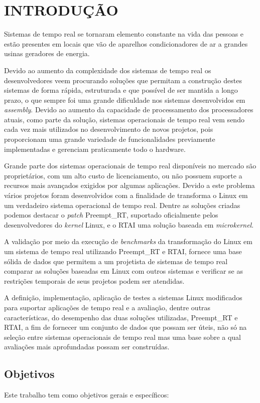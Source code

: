 \chapter{INTRODUÇÃO}
\label{cap:introducao}
Sistemas de tempo real se tornaram elemento constante na vida das pessoas e estão presentes em locais que vão de aparelhos condicionadores de ar a grandes usinas geradores de energia.

Devido ao aumento da complexidade dos sistemas de tempo real os desenvolvedores veem procurando soluções que permitam a construção destes sistemas de forma rápida, estruturada e que possível de ser mantida a longo prazo, o que sempre foi uma grande dificuldade nos sistemas desenvolvidos  em \textit{assembly}. Devido ao aumento da capacidade de processamento dos processadores atuais, como parte da solução, sistemas operacionais de tempo real vem sendo cada vez mais utilizados no desenvolvimento de novos projetos, pois proporcionam uma grande variedade de funcionalidades previamente implementadas e gerenciam praticamente todo o hardware. 

Grande parte dos sistemas operacionais de tempo real disponíveis no mercado são proprietários, com um alto custo de licenciamento, ou não possuem suporte a recursos mais avançados exigidos por algumas aplicações. Devido a este problema vários projetos foram desenvolvidos com a finalidade de transforma o Linux em um verdadeiro sistema operacional de tempo real. Dentre as soluções criadas podemos destacar o \textit{patch} Preempt\_RT, suportado oficialmente pelos desenvolvedores do \textit{kernel} Linux, e o RTAI uma solução baseada em \textit{microkernel}.

A validação por meio da execução de \textit{benchmarks} da transformação do Linux em um sistema de tempo real utilizando Preempt\_RT e RTAI, fornece uma base sólida de dados que permitem a um projetista de sistemas de tempo real comparar as soluções baseadas em Linux com outros sistemas e verificar se as restrições temporais de seus projetos podem ser atendidas.

A definição, implementação, aplicação de testes a sistemas Linux modificados para suportar aplicações de tempo real e a avaliação, dentre outras características, do desempenho das duas soluções utilizadas, Preempt\_RT e RTAI, a fim de fornecer um conjunto de dados que possam ser úteis, não só na seleção entre sistemas operacionais de tempo real mas uma base sobre a qual avaliações mais aprofundadas possam ser construídas. 


\section{Objetivos}
Este trabalho tem como objetivos gerais e específicos:
